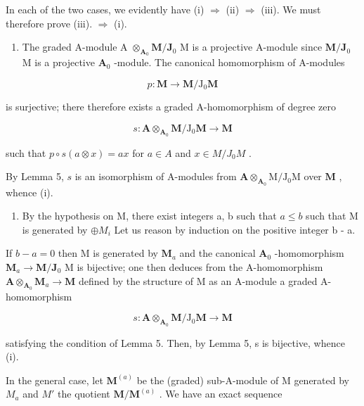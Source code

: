 In each of the two cases, we evidently have (i) \(\Rightarrow\) (ii) \(\Rightarrow\) (iii). We must therefore prove (iii). \(\Rightarrow\) (i).

\begin{enumerate}
\def\labelenumi{\alph{enumi})}
\tightlist
\item
  The graded A-module A \(\otimes_{\mathbf{A}_0}\mathbf{M} / \mathbf{J}_0\) M is a projective A-module since \(\mathbf{M} / \mathbf{J}_0\) M is a projective \(\mathbf{A}_0\) -module. The canonical homomorphism of A-modules
\end{enumerate}

\[
p: \mathbf {M} \rightarrow \mathbf {M} / \mathrm{J} _ {0} \mathbf {M}
\]

is surjective; there therefore exists a graded A-homomorphism of degree zero

\[
s: \mathbf {A} \otimes_ {\mathbf {A} _ {0}} \mathbf {M} / \mathrm{J} _ {0} \mathbf {M} \rightarrow \mathbf {M}
\]

such that \(p \circ s(a \otimes x) = ax\) for \(a \in A\) and \(x \in M / J_0 M\) .

By Lemma 5, \(s\) is an isomorphism of A-modules from \(\mathbf{A} \otimes_{\mathbf{A}_0} \mathrm{M} / \mathrm{J}_0 \mathrm{M}\) over \(\mathbf{M}\) , whence (i).

\begin{enumerate}
\def\labelenumi{\alph{enumi})}
\setcounter{enumi}{1}
\tightlist
\item
  By the hypothesis on M, there exist integers a, b such that \(a \leqslant b\) such that M is generated by \(\oplus M_{i}\) Let us reason by induction on the positive integer b - a.
\end{enumerate}

If \(b - a = 0\) then M is generated by \(\mathbf{M}_a\) and the canonical \(\mathbf{A}_0\) -homomorphism \(\mathbf{M}_a \to \mathbf{M} / \mathbf{J}_0\) M is bijective; one then deduces from the A-homomorphism \(\mathbf{A} \otimes_{\mathbf{A}_0} \mathbf{M}_a \to \mathbf{M}\) defined by the structure of M as an A-module a graded A-homomorphism

\[
s: \mathbf {A} \otimes_ {\mathbf {A} _ {0}} \mathbf {M} / \mathrm{J} _ {0} \mathbf {M} \rightarrow \mathbf {M}
\]

satisfying the condition of Lemma 5. Then, by Lemma 5, s is bijective, whence (i).

In the general case, let \(\mathbf{M}^{(a)}\) be the (graded) sub-A-module of M generated by \(M_{a}\) and \(M'\) the quotient \(\mathbf{M}/\mathbf{M}^{(a)}\) . We have an exact sequence

